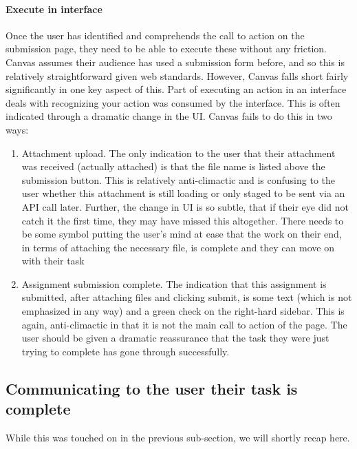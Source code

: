 \paragraph{Execute in interface}
Once the user has identified and comprehends the call to action on the submission page, they need to be able to execute these without any friction. Canvas assumes their audience has used a submission form before, and so this is relatively straightforward given web standards. However, Canvas falls short fairly significantly in one key aspect of this. Part of executing an action in an interface deals with recognizing your action was consumed by the interface. This is often indicated through a dramatic change in the UI. Canvas fails to do this in two ways:

\begin{enumerate}
\item
Attachment upload. The only indication to the user that their attachment was received (actually attached) is that the file name is listed above the submission button. This is relatively anti-climactic and is confusing to the user whether this attachment is still loading or only staged to be sent via an API call later. Further, the change in UI is so subtle, that if their eye did not catch it the first time, they may have missed this altogether. There needs to be some symbol putting the user's mind at ease that the work on their end, in terms of attaching the necessary file, is complete and they can move on with their task
\item
Assignment submission complete. The indication that this assignment is submitted, after attaching files and clicking submit, is some text (which is not emphasized in any way) and a green check on the right-hard sidebar. This is again, anti-climactic in that it is not the main call to action of the page. The user should be given a dramatic reassurance that the task they were just trying to complete has gone through successfully.
\end{enumerate}

\subsection{Communicating to the user their task is complete}

While this was touched on in the previous sub-section, we will shortly recap here.

